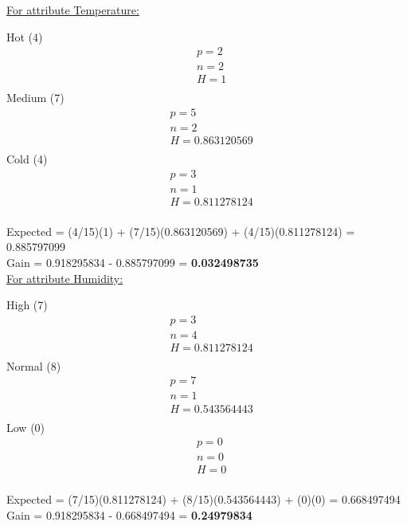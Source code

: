\documentclass[8pt, fullpage,letterpaper]{article}
\begin{document}
\begin{enumerate}
\begin{enumerate}
\begin{enumerate}
\begin{enumerate}
\begin{itemize}
						\underline {For attribute Temperature:} 
							\vspace{-5pt}
							\begin{multicols}{3}
								Hot (4)
			 						\begin{align*}
									    	& p = 2\\
										& n = 2 \\
									    	& H = 1\\
								      \end{align*}
								Medium (7)
			 						\begin{align*}
									    	& p = 5\\
										& n = 2 \\
									    	& H = 0.863120569\\
								      \end{align*}
								Cold (4)
			 						\begin{align*}
									    	& p = 3\\
										& n = 1 \\
									    	& H = 0.811278124\\
								      \end{align*}
							\end{multicols}
							\vspace{-20pt}
							Expected = (4/15)(1) + (7/15)(0.863120569) + (4/15)(0.811278124) = 0.885797099\\
							Gain = 0.918295834 - 0.885797099 = {\bf 0.032498735}\\

						\underline {For attribute Humidity:} 
							\vspace{-5pt}
							\begin{multicols}{3}
								High (7)
			 						\begin{align*}
									    	& p = 3\\
										& n = 4 \\
									    	& H = 0.811278124\\
								      \end{align*}
								Normal (8)
			 						\begin{align*}
									    	& p = 7\\
										& n = 1 \\
									    	& H = 0.543564443\\
								      \end{align*}
								Low (0)
			 						\begin{align*}
									    	& p = 0\\
										& n = 0 \\
									    	& H = 0\\
								      \end{align*}
							\end{multicols}
							\vspace{-20pt}
							Expected = (7/15)(0.811278124) + (8/15)(0.543564443) + (0)(0) = 0.668497494\\
							Gain = 0.918295834 - 0.668497494 = {\bf 0.24979834}\\


\end{itemize}
\end{enumerate}
\end{enumerate}
\end{enumerate}
\end{enumerate}
\end{document}
